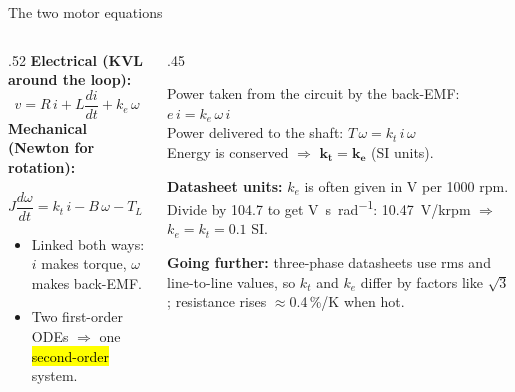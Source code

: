 \documentclass[aspectratio=169,10pt]{beamer}
\newcommand{\gofurther}[1]{{\scriptsize\color{mkGray}\textbf{Going further:} #1\par}}
\begin{document}
\begin{frame}{The two motor equations}
\begin{columns}[T]
\begin{column}{.52\textwidth}
\small
\textbf{Electrical (KVL around the loop):}
\[
v = R\,i + L\frac{di}{dt} + k_e\,\omega
\]
\textbf{Mechanical (Newton for rotation):}
\begin{eqbox}
$J\dfrac{d\omega}{dt} = k_t\,i - B\,\omega - T_L$
\end{eqbox}
\begin{itemize}\setlength\itemsep{1pt}
\item Linked both ways: $i$ makes torque, $\omega$ makes back-EMF.
\item Two first-order ODEs $\Rightarrow$ one \hl{second-order} system.
\end{itemize}
\end{column}
\begin{column}{.45\textwidth}
\begin{keybox}
\small
Power taken from the circuit by the back-EMF: $e\,i=k_e\,\omega\,i$\\
Power delivered to the shaft: $T\,\omega=k_t\,i\,\omega$\\
Energy is conserved $\Rightarrow$ $\bm{k_t=k_e}$ (SI units).
\end{keybox}
\small
\textbf{Datasheet units:} $k_e$ is often given in V per 1000 rpm.
Divide by 104.7 to get \si{\volt\second\per\radian}:
\SI{10.47}{\volt}/krpm $\Rightarrow$ $k_e=k_t=0.1$ SI.\\[1mm]
\gofurther{three-phase datasheets use rms and line-to-line values, so $k_t$ and $k_e$ differ by factors like $\sqrt3$; resistance rises $\approx$0.4\,\%/K when hot.}
\end{column}
\end{columns}
\end{frame}
\end{document}
